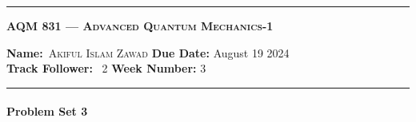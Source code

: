 \begin{center}
	\hrule
	\vspace{.4cm}
	\Large\scshape\textbf{AQM 831 --- Advanced Quantum Mechanics-1}
\end{center}
{\textbf{Name:}\ \textsc{Akiful Islam Zawad} \hspace{\hfill} \textbf{Due Date:} August 19 2024\\[5pt]
{ \textbf{Track Follower:}} \ 2 \hspace{\hfill} \textbf{Week Number:} 3 \\
	\hrule}
\paragraph*{Problem Set 3} %

